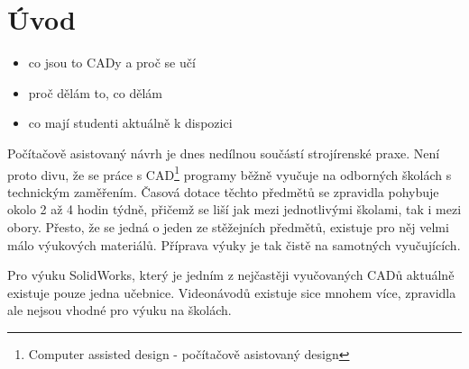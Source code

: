 \chapter*{Úvod}
\begin{itemize}
    \item co jsou to CADy a proč se učí
    \item proč dělám to, co dělám
    \item co mají studenti aktuálně k dispozici
\end{itemize}

Počítačově asistovaný návrh je dnes nedílnou součástí strojírenské praxe.
Není proto divu, že se práce s CAD\footnote{Computer assisted design - počítačově asistovaný design} programy běžně vyučuje na odborných školách s technickým zaměřením.
Časová dotace těchto předmětů se zpravidla pohybuje okolo 2 až 4 hodin týdně, přičemž se liší jak mezi jednotlivými školami, tak i mezi obory.
Přesto, že se jedná o jeden ze stěžejních předmětů, existuje pro něj velmi málo výukových materiálů.
Příprava výuky je tak čistě na samotných vyučujících.

Pro výuku SolidWorks, který je jedním z nejčastěji vyučovaných CADů aktuálně existuje pouze jedna učebnice.
Videonávodů existuje sice mnohem více, zpravidla ale nejsou vhodné pro výuku na školách.



\newpage
